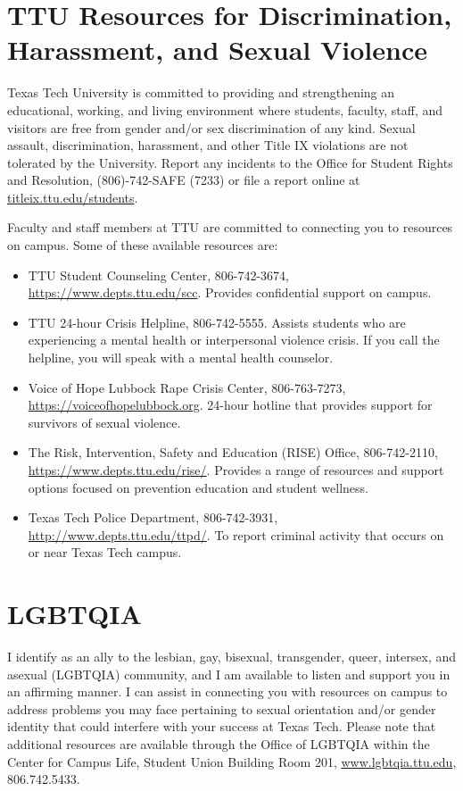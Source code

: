 \documentclass[12pt, notitlepage]{article}   	%
\begin{document}
\section{TTU Resources for Discrimination, Harassment, and Sexual Violence}
Texas Tech University is committed to providing and strengthening an educational, 
working, and living environment where students, faculty, staff, and visitors are 
free from gender and/or sex discrimination of any kind. Sexual assault, discrimination, 
harassment, and other Title IX violations are not tolerated by the University. 
Report any incidents to the Office for Student Rights and Resolution, 
(806)-742-SAFE (7233) or file a report online at 
\url{titleix.ttu.edu/students}. 

Faculty and staff members at TTU are committed to connecting you to resources on campus. 
Some of these available resources are: 
\begin{itemize}
	\item{TTU Student Counseling Center, 806-742-3674, \url{https://www.depts.ttu.edu/scc}. 
		Provides confidential support on campus.} 
	\item{TTU 24-hour Crisis Helpline, 806-742-5555. 
		Assists students who are experiencing a mental health or interpersonal violence 
		crisis. If you call the helpline, you will speak with a mental health counselor.} 
	\item{Voice of Hope Lubbock Rape Crisis Center, 806-763-7273, 
		\url{https://voiceofhopelubbock.org}.
		24-hour hotline that provides support for survivors of sexual violence.} 
	\item{The Risk, Intervention, Safety and Education (RISE) Office, 806-742-2110, 
		\url{https://www.depts.ttu.edu/rise/}. Provides a range of resources and support 
		options focused on prevention education and student wellness.} 
	\item{Texas Tech Police Department, 806-742-3931, 
		\url{http://www.depts.ttu.edu/ttpd/}. 
		To report criminal activity that occurs on or near Texas Tech campus.}
\end{itemize}

\section{LGBTQIA}
I identify as an ally to the lesbian, gay, bisexual, transgender, queer, intersex, 
and asexual (LGBTQIA) community, and I am available to listen and support you in an 
affirming manner. I can assist in connecting you with resources on campus to address 
problems you may face pertaining to sexual orientation and/or gender identity that could 
interfere with your success at Texas Tech. Please note that additional resources are 
available through the Office of LGBTQIA within the Center for Campus Life, 
Student Union Building Room 201, 
\url{www.lgbtqia.ttu.edu}, 806.742.5433.
\end{document}
